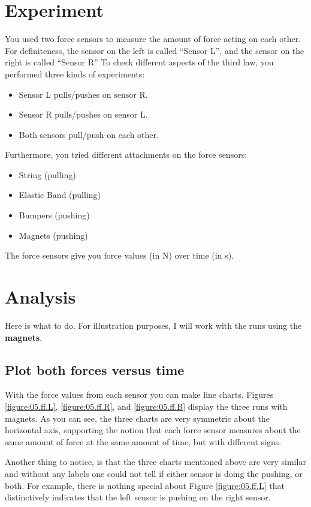 \section{Experiment}
%
You used two force sensors to measure the amount of force acting on each other. For definiteness, the sensor on the left is called ``Sensor L'', and the sensor on the right is called ``Sensor R'' To check different aspects of the third law, you performed three kinds of experiments:
\begin{itemize}
    \item Sensor L pulls/pushes on sensor R.
    \item Sensor R pulls/pushes on sensor L.
    \item Both sensors pull/push on each other.
\end{itemize}
Furthermore, you tried different attachments on the force sensors:
\begin{itemize}
    \item String (pulling)
    \item Elastic Band (pulling)
    \item Bumpers (pushing)
    \item Magnets (pushing)
\end{itemize}
The force sensors give you force values (in N) over time (in s).
%
\section{Analysis}
%
Here is what to do. For illustration purposes, I will work with the runs using the \textbf{magnets}.
%
\subsection{Plot both forces versus time}
%
With the force values from each sensor you can make line charts. Figures \ref{figure:05.ff.L}, \ref{figure:05.ff.R}, and \ref{figure:05.ff.B} display the three runs with magnets. As you can see, the three charts are very symmetric about the horizontal axis, supporting the notion that each force sensor measures about the same amount of force at the same amount of time, but with different signs.

Another thing to notice, is that the three charts mentioned above are very similar and without any labels one could not tell if either sensor is doing the pushing, or both. For example, there is nothing special about Figure \ref{figure:05.ff.L} that distinctively indicates that the left sensor is pushing on the right sensor.
%
